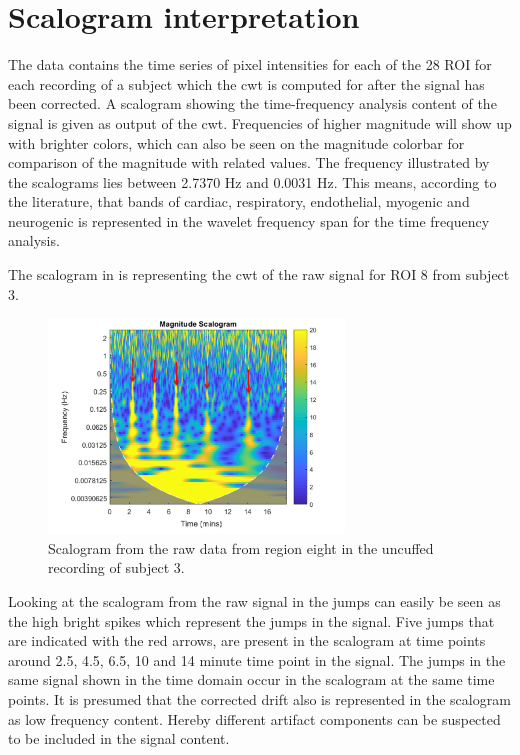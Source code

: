 \section{Scalogram interpretation}
\label{sec:scalogram}
The data contains the time series of pixel intensities for each of the 28 ROI for each recording of a subject which the cwt is computed for after the signal has been corrected.  
A scalogram showing the time-frequency analysis content of the signal is given as output of the cwt. Frequencies of higher magnitude will show up with brighter colors, which can also be seen on the magnitude colorbar for comparison of the magnitude with related values.
The frequency illustrated by the scalograms lies between 2.7370 Hz and 0.0031 Hz. This means, according to the literature, that bands of cardiac, respiratory, endothelial, myogenic and neurogenic is represented in the wavelet frequency span for the time frequency analysis. \cite{geyer2004, sagaidachnyi2014}

The scalogram in  is representing the cwt of the raw signal for ROI 8 from subject 3.

\begin{figure}[H]
	\includegraphics[width=0.7\textwidth]{figures/uncuffed_sub3_roi8_uncorr}
	\caption{Scalogram from the raw data from region eight in the uncuffed recording of subject 3.}
	\label{fig:scalogram_uncorr}
\end{figure}

Looking at the scalogram from the raw signal in  the jumps can easily be seen as the high bright spikes which represent the jumps in the signal. Five jumps that are indicated with the red arrows, are present in the scalogram at time points around 2.5, 4.5, 6.5, 10 and 14 minute time point in the signal. The jumps in the same signal shown in the time domain occur in the scalogram at the same time points. It is presumed that the corrected drift also is represented in the scalogram as low frequency content. Hereby different artifact components can be suspected to be included in the signal content. 

